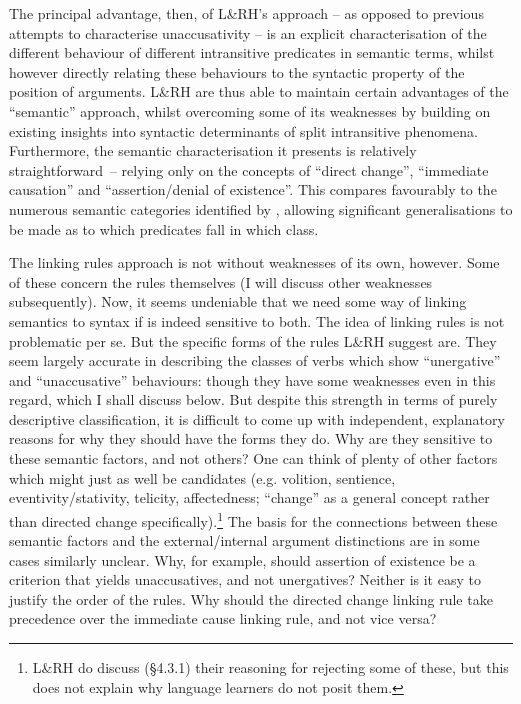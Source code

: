 \documentclass[output=paper]{langsci/langscibook}
\begin{document}
The principal advantage, then, of L\&RH’s approach – as opposed to previous
attempts to characterise unaccusativity – is an explicit characterisation of
the different behaviour of different intransitive predicates in semantic terms,
whilst however directly relating these behaviours to the syntactic property of
the position of arguments. L\&RH are thus able to maintain certain advantages
of the \enquote{semantic} approach, whilst overcoming some of its weaknesses by
building on existing insights into syntactic determinants of split intransitive
phenomena. Furthermore, the semantic characterisation it presents is relatively
straightforward~– relying only on the concepts of \enquote{direct change},
\enquote{immediate causation} and \enquote{assertion\slash denial of existence}. This
compares favourably to the numerous semantic categories identified by
\citet{Perlmutter1978}, allowing significant generalisations to be made as to
which predicates fall in which class.

The linking rules approach is not without weaknesses of its own, however. Some
of these concern the rules themselves (I will discuss other weaknesses
subsequently). Now, it seems undeniable that we need some way of linking
semantics to syntax if  is indeed sensitive to both. The
idea of linking rules is not problematic per se. But the specific forms of the
rules L\&RH suggest are.  They seem largely accurate in describing the classes
of verbs which show \enquote{unergative} and \enquote{unaccusative} behaviours:
though they have some weaknesses even in this regard, which I shall discuss
below. But despite this strength in terms of purely descriptive classification,
it is difficult to come up with independent, explanatory reasons for why they
should have the forms they do. Why are they sensitive to these semantic
factors, and not others? One can think of plenty of other factors which might
just as well be candidates (e.g. volition, sentience, eventivity/stativity,
telicity, affectedness; \enquote{change} as a general concept rather than
directed change specifically).\footnote{L\&RH do discuss (§4.3.1) their
reasoning for rejecting some of these, but this does not explain why language
learners do not posit them.}  The basis for the connections between these
semantic factors and the external/internal argument distinctions are in some
cases similarly unclear. Why, for example, should assertion of existence be a
criterion that yields unaccusatives, and not unergatives? Neither is it easy to
justify the order of the rules. Why should the directed change linking rule
take precedence over the immediate cause linking rule, and not vice versa?
\end{document}
